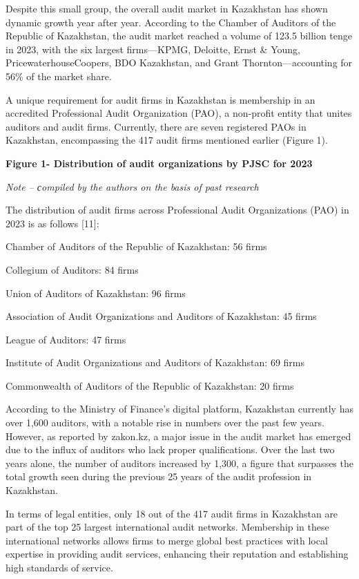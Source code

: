 Despite this small group, the overall audit market in Kazakhstan has
shown dynamic growth year after year. According to the Chamber of
Auditors of the Republic of Kazakhstan, the audit market reached a
volume of 123.5 billion tenge in 2023, with the six largest
firms---KPMG, Deloitte, Ernst \& Young, PricewaterhouseCoopers, BDO
Kazakhstan, and Grant Thornton---accounting for 56\% of the market
share.

A unique requirement for audit firms in Kazakhstan is membership in an
accredited Professional Audit Organization (PAO), a non-profit entity
that unites auditors and audit firms. Currently, there are seven
registered PAOs in Kazakhstan, encompassing the 417 audit firms
mentioned earlier (Figure 1).

\hl{}

\hl{}

\textbf{Figure 1- Distribution of audit organizations by PJSC for 2023}

\emph{Note -- сompiled by the authors on the basis of past research}

\hl{}

The distribution of audit firms across Professional Audit Organizations
(PAO) in 2023 is as follows {[}11{]}:

Chamber of Auditors of the Republic of Kazakhstan: 56 firms

Collegium of Auditors: 84 firms

Union of Auditors of Kazakhstan: 96 firms

Association of Audit Organizations and Auditors of Kazakhstan: 45 firms

League of Auditors: 47 firms

Institute of Audit Organizations and Auditors of Kazakhstan: 69 firms

Commonwealth of Auditors of the Republic of Kazakhstan: 20 firms

According to the Ministry of Finance's digital platform, Kazakhstan
currently has over 1,600 auditors, with a notable rise in numbers over
the past few years. However, as reported by zakon.kz, a major issue in
the audit market has emerged due to the influx of auditors who lack
proper qualifications. Over the last two years alone, the number of
auditors increased by 1,300, a figure that surpasses the total growth
seen during the previous 25 years of the audit profession in Kazakhstan.

In terms of legal entities, only 18 out of the 417 audit firms in
Kazakhstan are part of the top 25 largest international audit networks.
Membership in these international networks allows firms to merge global
best practices with local expertise in providing audit services,
enhancing their reputation and establishing high standards of service.

